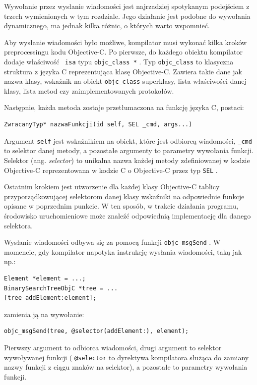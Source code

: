 \documentclass[mgr, shortabstract]{iithesis}
\newcommand{\ang}[1]{ang. \textit{#1}}
\newcommand{\objcinline}[1]{
    \texttt{#1}
}
\begin{document}
Wywołanie przez wysłanie wiadomości jest najrzadziej spotykanym podejściem z trzech wymienionych w tym rozdziale. Jego działanie jest podobne do wywołania dynamicznego, ma jednak kilka różnic, o których warto wspomnieć.

Aby wysłanie wiadomości było możliwe, kompilator musi wykonać kilka kroków preprocessingu kodu Objective-C. Po pierwsze, do każdego obiektu kompilator dodaje właściwość \objcinline{isa} typu \objcinline{objc_class *}. Typ \objcinline{objc_class} to klasyczna struktura z języka C reprezentująca klasę Objective-C. Zawiera takie dane jak nazwa klasy, wskaźnik na obiekt \objcinline{objc_class} superklasy, lista właściwości danej klasy, lista metod czy zaimplementowanych protokołów.

Następnie, każda metoda zostaje przetłumaczona na funkcję języka C, postaci:

\begin{verbatim}
ZwracanyTyp* nazwaFunkcji(id self, SEL _cmd, args...)
\end{verbatim}

Argument \objcinline{self} jest wskaźnikiem na obiekt, które jest odbiorcą wiadomości, \objcinline{_cmd} to selektor danej metody, a pozostałe argumenty to parametry wywołania funkcji. Selektor (\ang{selector}) to unikalna nazwa każdej metody zdefiniowanej w kodzie Objective-C reprezentowana w kodzie C o Objective-C przez typ \objcinline{SEL}.

Ostatnim krokiem jest utworzenie dla każdej klasy Objective-C tablicy przyporządkowującej selektorom danej klasy wskaźniki na odpowiednie funkcje opisane w poprzednim punkcie. W ten sposób, w trakcie działania programu, środowisko uruchomieniowe może znaleźć odpowiednią implementację dla danego selektora.

Wysłanie wiadomości odbywa się za pomocą funkcji \objcinline{objc_msgSend}. W momencie, gdy kompilator napotyka instrukcję wysłania wiadomości, taką jak np.:

\begin{verbatim}
Element *element = ...;
BinarySearchTreeObjC *tree = ...
[tree addElement:element];
\end{verbatim}

zamienia ją na wywołanie:

\begin{verbatim}
objc_msgSend(tree, @selector(addElement:), element);
\end{verbatim}

Pierwszy argument to odbiorca wiadomości, drugi argument to selektor wywoływanej funkcji (\objcinline{@selector} to dyrektywa kompilatora służąca do zamiany nazwy funkcji z ciągu znaków na selektor), a pozostałe to parametry wywołania funkcji.
\end{document}
